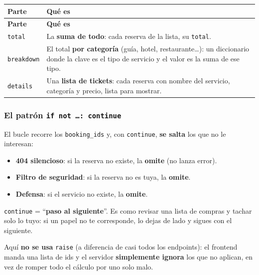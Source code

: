 \documentclass[11pt,a4paper]{article}
\begin{document}
\begin{center}
{\small
\setlength{\tabcolsep}{4pt}
\begin{longtable}{@{}>{\raggedright\arraybackslash}p{3.2cm}>{\raggedright\arraybackslash}p{11.5cm}@{}}
\toprule
\textbf{Parte} & \textbf{Qué es} \\
\midrule
\endfirsthead
\toprule
\textbf{Parte} & \textbf{Qué es} \\
\midrule
\endhead
\texttt{total} & La \textbf{suma de todo}: cada reserva de la lista, su \texttt{total}. \\
\texttt{breakdown} & El total \textbf{por categoría} (guía, hotel, restaurante\dots): un diccionario
donde la clave es el tipo de servicio y el valor es la suma de ese tipo. \\
\texttt{details} & Una \textbf{lista de tickets}: cada reserva con nombre del servicio,
categoría y precio, lista para mostrar. \\
\bottomrule
\end{longtable}
}
\end{center}

\subsubsection{El patrón \texttt{if not \dots: continue}}

El bucle recorre los \texttt{booking\_ids} y, con \texttt{continue}, \textbf{se salta} los
que no le interesan:
\begin{itemize}
    \item \textbf{404 silencioso}: si la reserva no existe, la \textbf{omite} (no lanza error).
    \item \textbf{Filtro de seguridad}: si la reserva no es tuya, la \textbf{omite}.
    \item \textbf{Defensa}: si el servicio no existe, la \textbf{omite}.
\end{itemize}

\begin{analogia}
\texttt{continue} = ``\textbf{paso al siguiente}''. Es como revisar una lista de compras y
tachar solo lo tuyo: si un papel no te corresponde, lo dejas de lado y sigues con el siguiente.
\end{analogia}

Aquí \textbf{no se usa} \texttt{raise} (a diferencia de casi todos los endpoints): el frontend
manda una lista de ids y el servidor \textbf{simplemente ignora} los que no aplican, en vez de
romper todo el cálculo por uno solo malo.
\end{document}
